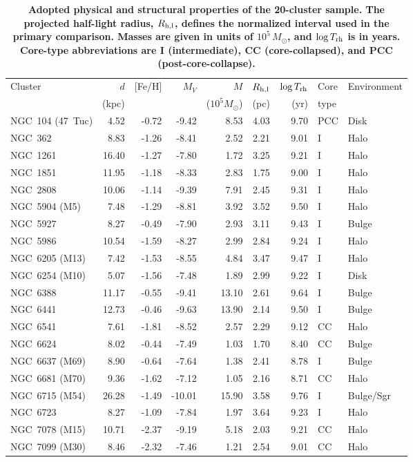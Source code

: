 \begin{table}
\centering
\caption{\textbf{Adopted physical and structural properties of the 20-cluster sample. The projected half-light radius, $R_{\rm h,l}$, defines the normalized interval used in the primary comparison. Masses are given in units of $10^5\,M_\odot$, and $\log T_{\rm rh}$ is in years. Core-type abbreviations are I (intermediate), CC (core-collapsed), and PCC (post-core-collapse).}}
\label{tab:sample}
\footnotesize
\setlength{\tabcolsep}{4.0pt}
\begin{tabular}{lrrrrrrll}
\hline
Cluster & $d$ & [Fe/H] & $M_V$ & $M$ & $R_{\rm h,l}$ & $\log T_{\rm rh}$ & Core & Environment \\
 & (kpc) & & & ($10^5M_\odot$) & (pc) & (yr) & type & \\
\hline
NGC~104 (47~Tuc) & 4.52 & -0.72 & -9.42 & 8.53 & 4.03 & 9.70 & PCC & Disk \\
NGC~362 & 8.83 & -1.26 & -8.41 & 2.52 & 2.21 & 9.01 & I & Halo \\
NGC~1261 & 16.40 & -1.27 & -7.80 & 1.72 & 3.25 & 9.21 & I & Halo \\
NGC~1851 & 11.95 & -1.18 & -8.33 & 2.83 & 1.75 & 9.00 & I & Halo \\
NGC~2808 & 10.06 & -1.14 & -9.39 & 7.91 & 2.45 & 9.31 & I & Halo \\
NGC~5904 (M5) & 7.48 & -1.29 & -8.81 & 3.92 & 3.52 & 9.50 & I & Halo \\
NGC~5927 & 8.27 & -0.49 & -7.90 & 2.93 & 3.11 & 9.43 & I & Bulge \\
NGC~5986 & 10.54 & -1.59 & -8.27 & 2.99 & 2.84 & 9.24 & I & Halo \\
NGC~6205 (M13) & 7.42 & -1.53 & -8.55 & 4.84 & 3.47 & 9.47 & I & Halo \\
NGC~6254 (M10) & 5.07 & -1.56 & -7.48 & 1.89 & 2.99 & 9.22 & I & Disk \\
NGC~6388 & 11.17 & -0.55 & -9.41 & 13.10 & 2.61 & 9.64 & I & Bulge \\
NGC~6441 & 12.73 & -0.46 & -9.63 & 13.90 & 2.14 & 9.50 & I & Bulge \\
NGC~6541 & 7.61 & -1.81 & -8.52 & 2.57 & 2.29 & 9.12 & CC & Halo \\
NGC~6624 & 8.02 & -0.44 & -7.49 & 1.03 & 1.70 & 8.40 & CC & Bulge \\
NGC~6637 (M69) & 8.90 & -0.64 & -7.64 & 1.38 & 2.41 & 8.78 & I & Bulge \\
NGC~6681 (M70) & 9.36 & -1.62 & -7.12 & 1.05 & 2.16 & 8.71 & CC & Halo \\
NGC~6715 (M54) & 26.28 & -1.49 & -10.01 & 15.90 & 3.58 & 9.76 & I & Bulge/Sgr \\
NGC~6723 & 8.27 & -1.09 & -7.84 & 1.97 & 3.64 & 9.23 & I & Halo \\
NGC~7078 (M15) & 10.71 & -2.37 & -9.19 & 5.18 & 2.03 & 9.21 & CC & Halo \\
NGC~7099 (M30) & 8.46 & -2.32 & -7.46 & 1.21 & 2.54 & 9.01 & CC & Halo \\
\hline
\end{tabular}
\end{table}